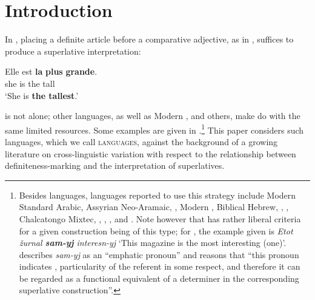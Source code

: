 \documentclass[output=paper
,modfonts
,nonflat]{langsci/langscibook}
\author{Elizabeth Coppock\affiliation{Boston University\\University of Gothenburg}\lastand Linnea Strand\affiliation{University of Gothenburg}}
\begin{document}

\maketitle
\section{Introduction} 
In , placing a definite article before a comparative adjective, as in , suffices to produce a superlative interpretation:

\ea \label{ex:coppockstrand:1}
\gll Elle est \textbf{la} \textbf{plus} \textbf{grande}.\\
she is the \cmpr{} tall\\ 
\glt `She is \textbf{the tallest}.' 
\z

 is not alone; other  languages, as well as Modern ,  and others, make do with the same limited resources. Some examples are given in .\footnote{Besides  languages, languages reported to use this strategy include 
Modern Standard Arabic, Assyrian Neo-Aramaic, , Modern , Biblical Hebrew, , , Chalcatongo Mixtec, , , , and  \citep{Bobaljik2012,Gorshenin2012}. Note however that \citeauthor{Gorshenin2012} has rather liberal criteria for a given construction being of this type; for , the example given is \textit{Etot \v{z}urnal \textbf{sam-yj} interesn-yj} `This magazine is the most interesting (one)'. \citet[129]{Gorshenin2012} describes \textit{sam-yj} as an ``emphatic pronoun'' and reasons that ``this pronoun indicates , particularity of the referent in some respect, and therefore it can be regarded as a functional equivalent of a determiner in the corresponding superlative construction''.} This paper considers such languages, which we call  \textsc{languages}, against the background of a growing literature on cross-linguistic variation with respect to the relationship between definiteness-marking and the interpretation of superlatives.
\end{document}

